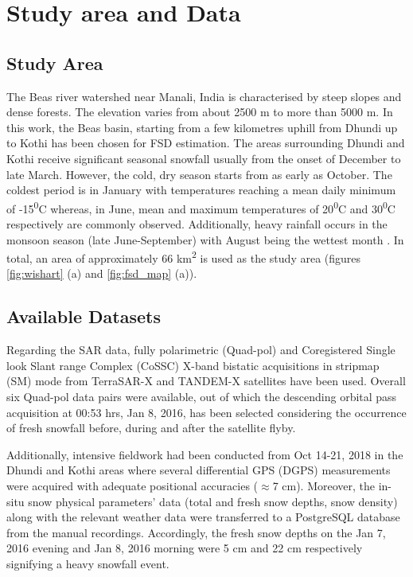 \documentclass{article}
\begin{document}
\section{Study area and Data}
\label{sec:study}
\subsection{Study Area}
\label{ssec:area}
The Beas river watershed near Manali, India is characterised by steep slopes and dense forests. The elevation varies from about 2500 m to more than 5000 m. In this work, the Beas basin, starting from a few kilometres uphill from Dhundi up to Kothi has been chosen for FSD estimation. The areas surrounding Dhundi and Kothi receive significant seasonal snowfall usually from the onset of December to late March. However, the cold, dry season starts from as early as October. The coldest period is in January with temperatures reaching a mean daily minimum of -15\textsuperscript{0}C whereas, in June, mean and maximum temperatures of 20\textsuperscript{0}C and 30\textsuperscript{0}C respectively are commonly observed. Additionally, heavy rainfall occurs in the monsoon season (late June-September) with August being the wettest month \cite{Thakur2012}. In total, an area of approximately 66 km\textsuperscript{2} is used as the study area (figures \ref{fig:wishart} (a) and \ref{fig:fsd_map} (a)).

\subsection{Available Datasets}
\label{ssec:data}
Regarding the SAR data, fully polarimetric (Quad-pol) and Coregistered Single look Slant range Complex (CoSSC) X-band bistatic acquisitions in stripmap (SM) mode from TerraSAR-X and TANDEM-X satellites have been used. Overall six Quad-pol data pairs were available, out of which the descending orbital pass acquisition at 00:53 hrs, Jan 8, 2016, has been selected considering the occurrence of fresh snowfall before, during and after the satellite flyby.

Additionally, intensive fieldwork had been conducted from Oct 14-21, 2018 in the Dhundi and Kothi areas where several differential GPS (DGPS) measurements were acquired with adequate positional accuracies ($\approx$7 cm). Moreover, the in-situ snow physical parameters’ data (total and fresh snow depths, snow density) along with the relevant weather data were transferred to a PostgreSQL database from the manual recordings. Accordingly, the fresh snow depths on the Jan 7, 2016 evening and Jan 8, 2016 morning were 5 cm and 22 cm respectively signifying a heavy snowfall event.
\end{document}
